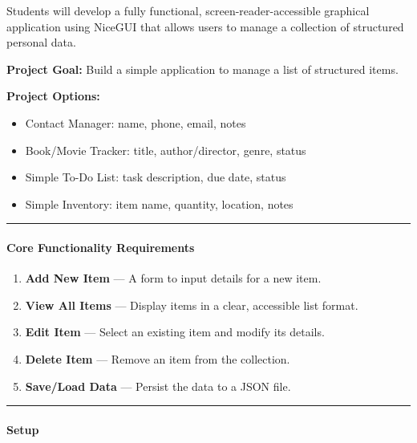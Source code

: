 \documentclass[
  justified,
  openright,
]{tufte-book}
\let\subsection\paragraph
\let\paragraph\paragraph
\let\subsection\paragraph
\let\paragraph\paragraph
\providecommand{\tightlist}{%
  \setlength{\itemsep}{0pt}\setlength{\parskip}{0pt}}
\begin{document}
Students will develop a fully functional, screen-reader-accessible
graphical application using NiceGUI that allows users to manage a
collection of structured personal data.

\textbf{Project Goal:} Build a simple application to manage a list of
structured items.

\textbf{Project Options:}

\begin{itemize}
\tightlist
\item
  Contact Manager: name, phone, email, notes
\item
  Book/Movie Tracker: title, author/director, genre, status
\item
  Simple To-Do List: task description, due date, status
\item
  Simple Inventory: item name, quantity, location, notes
\end{itemize}

\begin{center}\rule{0.5\linewidth}{0.5pt}\end{center}

\subsection{Core Functionality
Requirements}\label{core-functionality-requirements}

\begin{enumerate}
\def\labelenumi{\arabic{enumi}.}
\tightlist
\item
  \textbf{Add New Item} --- A form to input details for a new item.
\item
  \textbf{View All Items} --- Display items in a clear, accessible list
  format.
\item
  \textbf{Edit Item} --- Select an existing item and modify its details.
\item
  \textbf{Delete Item} --- Remove an item from the collection.
\item
  \textbf{Save/Load Data} --- Persist the data to a JSON file.
\end{enumerate}

\begin{center}\rule{0.5\linewidth}{0.5pt}\end{center}

\subsection{Setup}\label{setup}
\end{document}
